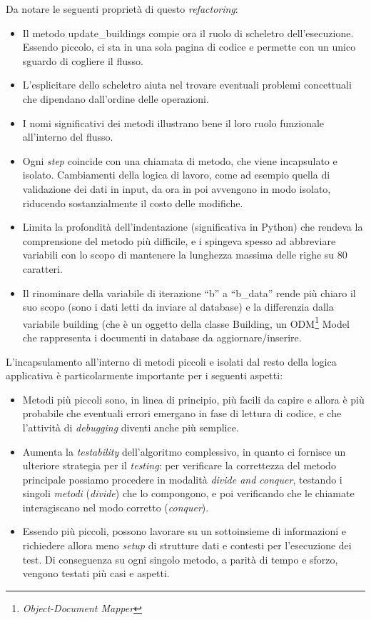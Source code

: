 \documentclass[12pt]{report}
\begin{document}
Da notare le seguenti proprietà di questo \textit{refactoring}:
\begin{itemize}
  \item Il metodo update\_buildings compie ora il ruolo
  di scheletro dell'esecuzione. Essendo piccolo, ci sta in una sola
  pagina di codice e permette con un unico sguardo di cogliere il flusso.
  \item L'esplicitare dello scheletro aiuta nel trovare
   eventuali problemi concettuali che dipendano dall'ordine
   delle operazioni.
  \item I nomi significativi dei metodi illustrano bene il loro 
  ruolo funzionale all'interno del flusso. 
  \item Ogni \textit{step} coincide con una chiamata di metodo, 
  che viene incapsulato e isolato. Cambiamenti della logica di
  lavoro, come ad esempio quella di validazione dei dati in input,
  da ora in poi avvengono in modo isolato, riducendo
  sostanzialmente il costo delle modifiche.
  \item Limita la profondità dell'indentazione (significativa in Python) 
  che rendeva la comprensione del metodo più difficile, e i spingeva spesso
  ad abbreviare variabili con lo scopo di mantenere la lunghezza massima
  delle righe su 80 caratteri.
  \item Il rinominare della variabile di iterazione ``b'' a ``b\_data'' rende
  più chiaro il suo scopo (sono i dati letti da inviare al database) 
  e la differenzia dalla variabile building (che è un oggetto della
  classe Building, un ODM\footnote{\textit{Object-Document Mapper}} Model che
  rappresenta i documenti in database da aggiornare/inserire. 
\end{itemize}

L'incapsulamento all'interno di metodi piccoli e isolati dal resto della
logica applicativa è particolarmente importante per i seguenti aspetti:

\begin{itemize}
  \item Metodi più piccoli sono, in linea di principio, più facili 
  da capire e allora è più probabile 
  che eventuali errori emergano in fase di lettura di codice,
  e che l'attività di \textit{debugging} diventi anche più semplice.
  \item Aumenta la \textit{testability} dell'algoritmo complessivo, in quanto
  ci fornisce un ulteriore strategia per il \textit{testing}: 
  per verificare la correttezza del metodo principale 
  possiamo procedere in modalità \textit{divide and conquer}, 
  testando i singoli \textit{metodi} (\textit{divide}) 
  che lo compongono, e poi verificando che le
  chiamate interagiscano nel modo corretto (\textit{conquer}).
  \item Essendo più piccoli, possono lavorare su un sottoinsieme 
  di informazioni e richiedere allora meno \textit{setup} 
  di strutture dati e contesti per l'esecuzione dei test. Di conseguenza
  su ogni singolo metodo, a parità di tempo e sforzo, vengono testati
  più casi e aspetti.
\end{itemize}
\end{document}
